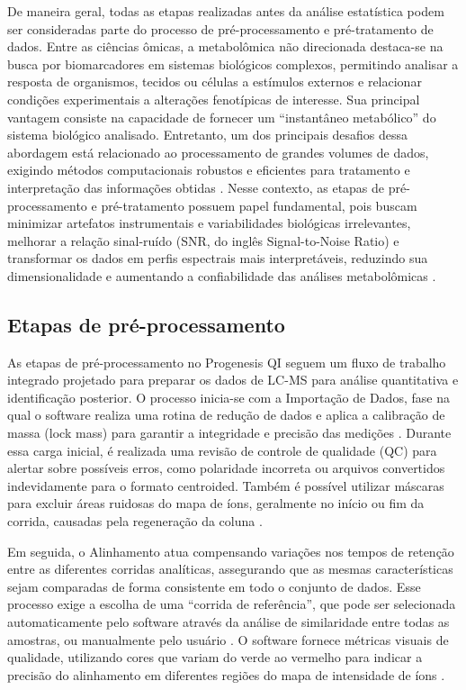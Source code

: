 De maneira geral, todas as etapas realizadas antes da análise estatística podem ser consideradas parte do processo de pré-processamento e pré-tratamento de dados. Entre as ciências ômicas, a metabolômica não direcionada destaca-se na busca por biomarcadores em sistemas biológicos complexos, permitindo analisar a resposta de organismos, tecidos ou células a estímulos externos e relacionar condições experimentais a alterações fenotípicas de interesse. Sua principal vantagem consiste na capacidade de fornecer um “instantâneo metabólico” do sistema biológico analisado. Entretanto, um dos principais desafios dessa abordagem está relacionado ao processamento de grandes volumes de dados, exigindo métodos computacionais robustos e eficientes para tratamento e interpretação das informações obtidas \cite{schrimpe2016untargeted}. Nesse contexto, as etapas de pré-processamento e pré-tratamento possuem papel fundamental, pois buscam minimizar artefatos instrumentais e variabilidades biológicas irrelevantes, melhorar a relação sinal-ruído (SNR, do inglês Signal-to-Noise Ratio) e transformar os dados em perfis espectrais mais interpretáveis, reduzindo sua dimensionalidade e aumentando a confiabilidade das análises metabolômicas \cite{sun2024pretreating}.

\subsection{Etapas de pré-processamento}

As etapas de pré-processamento no Progenesis QI seguem um fluxo de trabalho integrado projetado para preparar os dados de LC-MS para análise quantitativa e identificação posterior. O processo inicia-se com a Importação de Dados, fase na qual o software realiza uma rotina de redução de dados e aplica a calibração de massa (lock mass) para garantir a integridade e precisão das medições \cite{watersprogenesisguide}. Durante essa carga inicial, é realizada uma revisão de controle de qualidade (QC) para alertar sobre possíveis erros, como polaridade incorreta ou arquivos convertidos indevidamente para o formato centroided. Também é possível utilizar máscaras para excluir áreas ruidosas do mapa de íons, geralmente no início ou fim da corrida, causadas pela regeneração da coluna \cite{watersprogenesisguide}.

Em seguida, o Alinhamento atua compensando variações nos tempos de retenção entre as diferentes corridas analíticas, assegurando que as mesmas características sejam comparadas de forma consistente em todo o conjunto de dados. Esse processo exige a escolha de uma ``corrida de referência'', que pode ser selecionada automaticamente pelo software através da análise de similaridade entre todas as amostras, ou manualmente pelo usuário \cite{watersprogenesisguide}. O software fornece métricas visuais de qualidade, utilizando cores que variam do verde ao vermelho para indicar a precisão do alinhamento em diferentes regiões do mapa de intensidade de íons \cite{watersprogenesisguide}.

